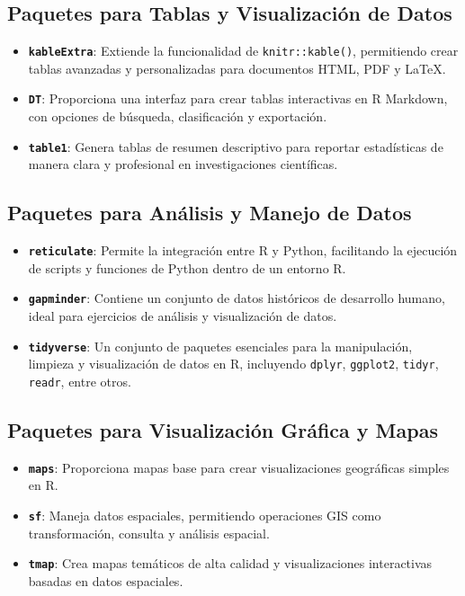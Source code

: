 \documentclass[
  10pt,
]{article}
\begin{document}
\subsection{Paquetes para Tablas y Visualización de
Datos}\label{paquetes-para-tablas-y-visualizaciuxf3n-de-datos}

\begin{itemize}
\item
  \textbf{\texttt{kableExtra}}: Extiende la funcionalidad de
  \texttt{knitr::kable()}, permitiendo crear tablas avanzadas y
  personalizadas para documentos HTML, PDF y LaTeX.
\item
  \textbf{\texttt{DT}}: Proporciona una interfaz para crear tablas
  interactivas en R Markdown, con opciones de búsqueda, clasificación y
  exportación.
\item
  \textbf{\texttt{table1}}: Genera tablas de resumen descriptivo para
  reportar estadísticas de manera clara y profesional en investigaciones
  científicas.
\end{itemize}

\subsection{Paquetes para Análisis y Manejo de
Datos}\label{paquetes-para-anuxe1lisis-y-manejo-de-datos}

\begin{itemize}
\item
  \textbf{\texttt{reticulate}}: Permite la integración entre R y Python,
  facilitando la ejecución de scripts y funciones de Python dentro de un
  entorno R.
\item
  \textbf{\texttt{gapminder}}: Contiene un conjunto de datos históricos
  de desarrollo humano, ideal para ejercicios de análisis y
  visualización de datos.
\item
  \textbf{\texttt{tidyverse}}: Un conjunto de paquetes esenciales para
  la manipulación, limpieza y visualización de datos en R, incluyendo
  \texttt{dplyr}, \texttt{ggplot2}, \texttt{tidyr}, \texttt{readr},
  entre otros.
\end{itemize}

\subsection{Paquetes para Visualización Gráfica y
Mapas}\label{paquetes-para-visualizaciuxf3n-gruxe1fica-y-mapas}

\begin{itemize}
\item
  \textbf{\texttt{maps}}: Proporciona mapas base para crear
  visualizaciones geográficas simples en R.
\item
  \textbf{\texttt{sf}}: Maneja datos espaciales, permitiendo operaciones
  GIS como transformación, consulta y análisis espacial.
\item
  \textbf{\texttt{tmap}}: Crea mapas temáticos de alta calidad y
  visualizaciones interactivas basadas en datos espaciales.
\end{itemize}
\end{document}
